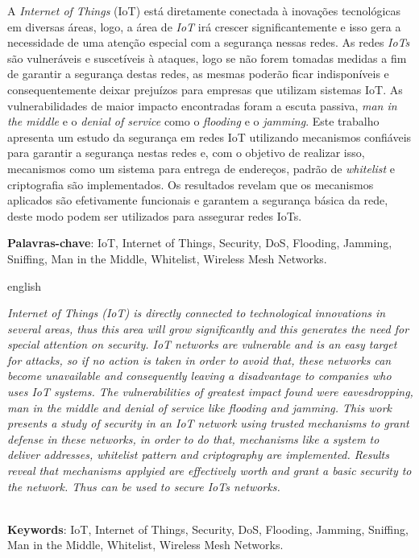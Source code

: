 \setlength{\absparsep}{18pt} %
\begin{resumo}
A \emph{Internet of Things} (IoT) est\'a diretamente conectada \`a inova\c{c}\~oes tecnol\'ogicas em diversas \'areas, logo, a \'area de \emph{IoT} ir\'a crescer significantemente e isso gera a necessidade de uma aten\c{c}\~ao especial com a seguran\c{c}a nessas redes. As redes \emph{IoTs} s\~ao vulner\'aveis e suscet\'iveis \`a ataques, logo se n\~ao forem tomadas medidas a fim de garantir a seguran\c{c}a destas redes, as mesmas poder\~ao ficar indispon\'iveis e consequentemente deixar preju\'izos para empresas que utilizam sistemas IoT. As vulnerabilidades de maior impacto encontradas foram a escuta passiva, \emph{man in the middle} e o \emph{denial of service} como o \emph{flooding} e o \emph{jamming}. Este trabalho apresenta um estudo da seguran\c{c}a em redes IoT utilizando mecanismos confi\'aveis para garantir a seguran\c{c}a nestas redes e, com o objetivo de realizar isso, mecanismos como um sistema para entrega de endere\c{c}os, padr\~ao de \emph{whitelist} e criptografia s\~ao implementados. Os resultados revelam que os mecanismos aplicados s\~ao efetivamente funcionais e garantem a seguran\c{c}a b\'asica da rede, deste modo podem ser utilizados para assegurar redes IoTs. 
    
    \vspace{\onelineskip}
    \noindent
    \textbf{Palavras-chave}: IoT, Internet of Things, Security, DoS, Flooding, Jamming, Sniffing, Man in the Middle, Whitelist, Wireless Mesh Networks.
\end{resumo}

\begin{resumo}[Abstract]
    \begin{otherlanguage*}{english}

\textit{%
Internet of Things (IoT) is directly connected to technological innovations in several areas, thus this area will grow significantly and this generates the need for special attention on security. IoT networks are vulnerable and is an easy target for attacks, so if no action is taken in order to avoid that, these networks can become unavailable and consequently leaving a disadvantage to companies who uses IoT systems. The vulnerabilities of greatest impact found were eavesdropping, man in the middle and denial of service like flooding and jamming. This work presents a study of security in an IoT network using trusted mechanisms to grant defense in these networks, in order to do that, mechanisms like a system to deliver addresses, whitelist pattern and criptography are implemented. Results reveal that mechanisms applyied are effectively worth and grant a basic security to the network. Thus can be used to secure IoTs networks.
}%

	    \vspace{\onelineskip}
	    \noindent
	    \\
	    \textbf{Keywords}: IoT, Internet of Things, Security, DoS, Flooding, Jamming, Sniffing, Man in the Middle, Whitelist, Wireless Mesh Networks.
    \end{otherlanguage*}
\end{resumo}
